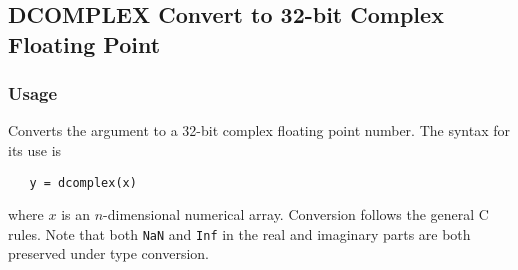 %
%
%
\subsection{DCOMPLEX Convert to 32-bit Complex Floating Point}
\subsubsection{Usage}
Converts the argument to a 32-bit complex floating point number.  The syntax
for its use is
\begin{verbatim}
   y = dcomplex(x)
\end{verbatim}
where $x$ is an $n$-dimensional numerical array.  Conversion follows the general C rules.  Note that both \verb|NaN| and \verb|Inf| in the real and imaginary parts are both preserved under type conversion.
